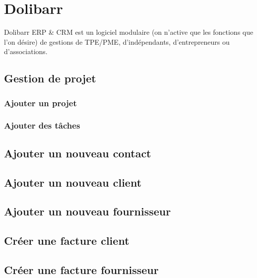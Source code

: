 \documentclass[a4paper]{article}
\begin{document}
\section[Dolibarr, logiciel de gestion]{Dolibarr}
\label{sec:Dolibarr}
Dolibarr ERP \& CRM est un logiciel modulaire (on n'active que les
fonctions que l'on désire) de gestions de TPE/PME, d'indépendants,
d'entrepreneurs ou d'associations.

\subsection{Gestion de projet}
\label{sec:DolibarrGestionProjet}

\subsubsection{Ajouter un projet}
\label{sec:DolibarrAjouterProjet}

\subsubsection{Ajouter des tâches}
\label{sec:DolibarrAjouterTaches}

\subsection{Ajouter un nouveau contact}
\label{sec:DolibarrAjouterNouveauContact}

\subsection{Ajouter un nouveau client}
\label{sec:DolibarrAjouterNouveauClient}

\subsection{Ajouter un nouveau fournisseur}
\label{sec:DolibarrAjouterNouveauFournisseur}

\subsection{Créer une facture client}
\label{sec:DolibarrFactureClient}

\subsection{Créer une facture fournisseur}
\label{sec:DolibarrFactureFournisseur}
\end{document}
